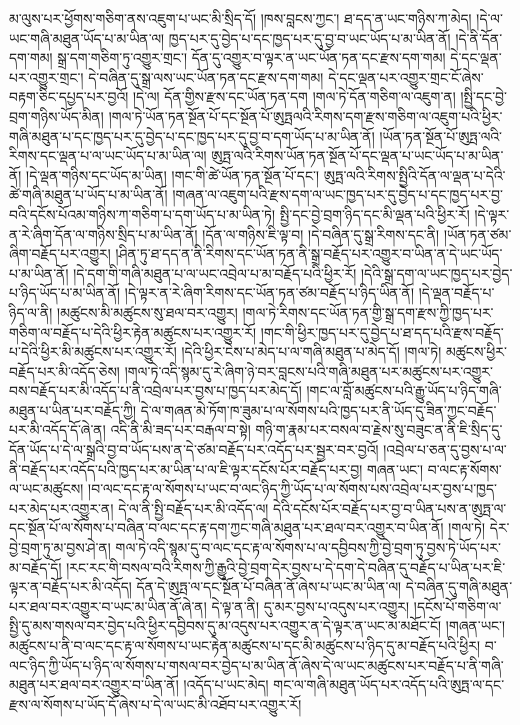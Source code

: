 མ་ལུས་པར་ཕྱོགས་གཅིག་ནས་འཇུག་པ་ཡང་མི་སྲིད་དོ། །ཁས་བླངས་ཀྱང་། ཐ་དད་ན་ཡང་གཉིས་ཀ་མེད། །དེ་ལ་ཡང་གཞི་མཐུན་ཡོད་པ་མ་ཡིན་ལ། ཁྱད་པར་དུ་བྱེད་པ་དང་ཁྱད་པར་དུ་བྱ་བ་ཡང་ཡོད་པ་མ་ཡིན་ནོ། །དེ་ནི་དོན་དག་གམ། སྒྲ་དག་གཅིག་ཏུ་འགྱུར་གྲང་། དོན་དུ་འགྱུར་བ་ལྟར་ན་ཡང་ཡོན་ཏན་དང་རྫས་དག་གམ། དེ་དང་ལྡན་པར་འགྱུར་གྲང་། དེ་བཞིན་དུ་སྒྲ་ལས་ཡང་ཡོན་ཏན་དང་རྫས་དག་གམ། དེ་དང་ལྡན་པར་འགྱུར་གྲང་ངོ་ཞེས་བརྟག་ཅིང་དཔྱད་པར་བྱའོ། །དེ་ལ། དོན་གྱིས་རྫས་དང་ཡོན་ཏན་དག །གལ་ཏེ་དོན་གཅིག་ལ་འཇུག་ན། །སྤྱི་དང་བྱེ་བྲག་གཉིས་ཡོད་མིན། །གལ་ཏེ་ཡོན་ཏན་སྔོན་པོ་དང་སྔོན་པོ་ཨུཏྤལའི་རིགས་དག་རྫས་གཅིག་ལ་འཇུག་པའི་ཕྱིར་གཞི་མཐུན་པ་དང་ཁྱད་པར་དུ་བྱེད་པ་དང་ཁྱད་པར་དུ་བྱ་བ་དག་ཡོད་པ་མ་ཡིན་ནོ། །ཡོན་ཏན་སྔོན་པོ་ཨུཏྤ་ལའི་རིགས་དང་ལྡན་པ་ལ་ཡང་ཡོད་པ་མ་ཡིན་ལ། ཨུཏྤ་ལའི་རིགས་ཡོན་ཏན་སྔོན་པོ་དང་ལྡན་པ་ཡང་ཡོད་པ་མ་ཡིན་ནོ། །དེ་ལྡན་གཉིས་དང་ཡོད་མ་ཡིན། །གང་གི་ཚེ་ཡོན་ཏན་སྔོན་པོ་དང་། ཨུཏྤ་ལའི་རིགས་སྤྱིའི་དོན་ལ་ལྡན་པ་དེའི་ཚེ་གཞི་མཐུན་པ་ཡོད་པ་མ་ཡིན་ནོ། །གཞན་ལ་འཇུག་པའི་རྫས་དག་ལ་ཡང་ཁྱད་པར་དུ་བྱེད་པ་དང་ཁྱད་པར་བྱ་བའི་དངོས་པོའམ་གཉིས་ཀ་གཅིག་པ་དག་ཡོད་པ་མ་ཡིན་ཏེ། སྤྱི་དང་བྱེ་བྲག་ཉིད་དང་མི་ལྡན་པའི་ཕྱིར་རོ། །དེ་ལྟར་ན་རེ་ཞིག་དོན་ལ་གཉིས་སྲིད་པ་མ་ཡིན་ནོ། །དོན་ལ་གཉིས་ཇི་ལྟ་བ། །དེ་བཞིན་དུ་སྒྲ་རིགས་དང་ནི། །ཡོན་ཏན་ཙམ་ཞིག་བརྗོད་པར་འགྱུར། །ཤིན་ཏུ་ཐ་དད་ན་ནི་རིགས་དང་ཡོན་ཏན་ནི་སྒྲ་བརྗོད་པར་འགྱུར་བ་ཡིན་ན་དེ་ཡང་ཡོད་པ་མ་ཡིན་ནོ། །དེ་དག་གི་གཞི་མཐུན་པ་ལ་ཡང་འབྲེལ་པ་མ་བརྗོད་པའི་ཕྱིར་རོ། །དེའི་སྒྲ་དག་ལ་ཡང་ཁྱད་པར་བྱེད་པ་ཉིད་ཡོད་པ་མ་ཡིན་ནོ། །དེ་ལྟར་ན་རེ་ཞིག་རིགས་དང་ཡོན་ཏན་ཙམ་བརྗོད་པ་ཉིད་ཡིན་ནོ། །དེ་ལྡན་བརྗོད་པ་ཉིད་ལ་ནི། །མཚུངས་མི་མཚུངས་སུ་ཐལ་བར་འགྱུར། །གལ་ཏེ་རིགས་དང་ཡོན་ཏན་གྱི་སྒྲ་དག་རྫས་ཀྱི་ཁྱད་པར་གཅིག་ལ་བརྗོད་པ་དེའི་ཕྱིར་རྟེན་མཚུངས་པར་འགྱུར་རོ། །གང་གི་ཕྱིར་ཁྱད་པར་དུ་བྱེད་པ་ཐ་དད་པའི་རྫས་བརྗོད་པ་དེའི་ཕྱིར་མི་མཚུངས་པར་འགྱུར་རོ། །དེའི་ཕྱིར་ངེས་པ་མེད་པ་ལ་གཞི་མཐུན་པ་མེད་དོ། །གལ་ཏེ། མཚུངས་ཕྱིར་བརྗོད་པར་མི་འདོད་ཅེས། །གལ་ཏེ་འདི་སྙམ་དུ་རེ་ཞིག་ཉེ་བར་བླངས་པའི་གཞི་མཐུན་པར་མཚུངས་པར་འགྱུར་བས་བརྗོད་པར་མི་འདོད་པ་ནི་འབྲེལ་པར་བྱས་པ་ཁྱད་པར་མེད་དོ། །གང་ལ་བློ་མཚུངས་པའི་རྒྱུ་ཡོད་པ་ཉིད་གཞི་མཐུན་པ་ཡིན་པར་བརྗོད་ཀྱི། དེ་ལ་གཞན་མེ་ཏོག་ཁ་ཟུམ་པ་ལ་སོགས་པའི་ཁྱད་པར་ནི་ཡོད་དུ་ཟིན་ཀྱང་བརྗོད་པར་མི་འདོད་དོ་ཞེ་ན། འདི་ནི་མི་ཟད་པར་བརྒལ་བ་སྟེ། གཉི་ག་རྣམ་པར་བསལ་བ་རྗེས་སུ་བཟུང་ན་ནི་ཇི་སྲིད་དུ་དོན་ཡོད་པ་དེ་ལ་སྒྲའི་བྱ་བ་ཡོད་པས་ན་དེ་ཙམ་བརྗོད་པར་འདོད་པར་སྦྱར་བར་བྱའོ། །འབྲེལ་པ་ཅན་དུ་བྱས་པ་ལ་ནི་བརྗོད་པར་འདོད་པའི་ཁྱད་པར་མ་ཡིན་པ་ལ་ཇི་ལྟར་དངོས་པོར་བརྗོད་པར་བྱ། གཞན་ཡང་། བ་ལང་རྟ་སོགས་ལ་ཡང་མཚུངས། །བ་ལང་དང་རྟ་ལ་སོགས་པ་ཡང་བ་ལང་ཉིད་ཀྱི་ཡོད་པ་ལ་སོགས་པས་འབྲེལ་པར་བྱས་པ་ཁྱད་པར་མེད་པར་འགྱུར་ན། དེ་ལ་ནི་སྤྱི་བརྗོད་པར་མི་འདོད་ལ། དེའི་དངོས་པོར་བརྗོད་པར་བྱ་བ་ཡིན་པས་ན་ཨུཏྤ་ལ་དང་སྔོན་པོ་ལ་སོགས་པ་བཞིན་བ་ལང་དང་རྟ་དག་ཀྱང་གཞི་མཐུན་པར་ཐལ་བར་འགྱུར་བ་ཡིན་ནོ། །གལ་ཏེ། དེར་བྱེ་བྲག་ཏུ་མ་བྱས་ཤེ་ན། གལ་ཏེ་འདི་སྙམ་དུ་བ་ལང་དང་རྟ་ལ་སོགས་པ་ལ་དབྱིབས་ཀྱི་བྱེ་བྲག་ཏུ་བྱས་ཏེ་ཡོད་པར་མ་བརྗོད་དོ། །རང་རང་གི་བསལ་བའི་རིགས་ཀྱི་རྒྱུའི་བྱེ་བྲག་དེར་བྱས་པ་དེ་དག་དེ་བཞིན་དུ་བརྗོད་པ་ཡིན་པར་ཇི་ལྟར་ན་བརྗོད་པར་མི་འདོད། དོན་དེ་ཨུཏྤ་ལ་དང་སྔོན་པོ་བཞིན་ནོ་ཞེས་པ་ཡང་མ་ཡིན་ལ། དེ་བཞིན་དུ་གཞི་མཐུན་པར་ཐལ་བར་འགྱུར་བ་ཡང་མ་ཡིན་ནོ་ཞེ་ན། དེ་ལྟ་ན་ནི། དུ་མར་བྱས་པ་འདུས་པར་འགྱུར། །དངོས་པོ་གཅིག་ལ་སྤྱི་དུ་མས་གསལ་བར་བྱེད་པའི་ཕྱིར་དབྱིབས་དུ་མ་འདུས་པར་འགྱུར་ན་དེ་ལྟར་ན་ཡང་མ་མཐོང་ངོ། །གཞན་ཡང་། མཚུངས་པ་ནི་བ་ལང་དང་རྟ་ལ་སོགས་པ་ཡང་རྟེན་མཚུངས་པ་དང་མི་མཚུངས་པ་ཉིད་དུ་མ་བརྗོད་པའི་ཕྱིར། བ་ལང་ཉིད་ཀྱི་ཡོད་པ་ཉིད་ལ་སོགས་པ་གསལ་བར་བྱེད་པ་མ་ཡིན་ནོ་ཞེས་དེ་ལ་ཡང་མཚུངས་པར་བརྗོད་པ་ནི་གཞི་མཐུན་པར་ཐལ་བར་འགྱུར་བ་ཡིན་ནོ། །འདོད་པ་ཡང་མེད། གང་ལ་གཞི་མཐུན་ཡོད་པར་འདོད་པའི་ཨུཏྤ་ལ་དང་རྫས་ལ་སོགས་པ་ཡོད་དོ་ཞེས་པ་དེ་ལ་ཡང་མི་འཐོབ་པར་འགྱུར་རོ། 